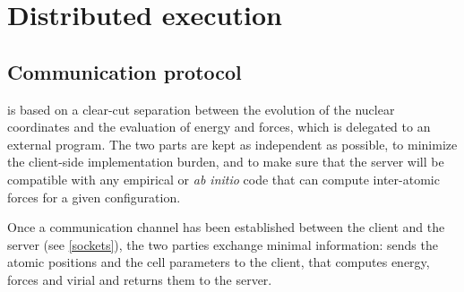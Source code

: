 \documentclass[11pt,english,fleqn]{report}
\begin{document}
\section{Distributed execution}

\label{distrib}

\subsection{Communication protocol}

\ipi is based on a clear-cut separation between the 
evolution of the nuclear coordinates and the evaluation of energy
and forces, which is delegated to an external program.
The two parts are kept as independent as possible, to minimize
the client-side implementation burden, and to make sure that the 
server will be compatible with any empirical or \emph{ab initio} code that 
can compute inter-atomic forces for a given configuration.

Once a communication channel has been established between the 
client and the server (see \ref{sockets}), the two parties
exchange minimal information: \ipi{} sends the atomic positions
and the cell parameters to the client, that computes energy, forces
and virial and returns them to the server. 
\end{document}
